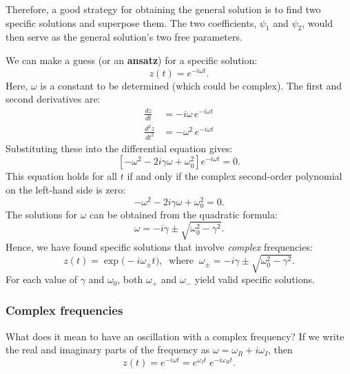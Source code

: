 \documentclass[10pt,a4paper]{article}
\begin{document}
Therefore, a good strategy for obtaining the general solution is to find
two specific solutions and superpose them. The two coefficients,
$\psi_1$ and $\psi_2$, would then serve as the general solution's
two free parameters.

We can make a guess (or an \textbf{ansatz}) for a specific solution:
\begin{equation}
z(t) = e^{-i\omega t}.
\end{equation}
Here, $\omega$ is a constant to be determined (which could be
complex). The first and second derivatives are:
\begin{align}
  \frac{dz}{dt} &= -i\omega\, e^{-i\omega t} \\
  \frac{d^2z}{dt^2} &= -\omega^2\, e^{-i\omega t}
\end{align}
Substituting these into the differential equation gives:
\begin{equation}
  \left[-\omega^2 - 2i\gamma \omega + \omega_0^2 \right] e^{-i\omega t} = 0.
\end{equation}
This equation holds for all $t$ if and only if the complex
second-order polynomial on the left-hand side is zero:
\begin{equation}
  -\omega^2 - 2i\gamma \omega + \omega_0^2 = 0.
\end{equation}
The solutions for $\omega$ can be obtained from the quadratic formula:
\begin{equation}
  \omega = -i\gamma \pm \sqrt{\omega_0^2 - \gamma^2}.
\end{equation}
Hence, we have found specific solutions that involve \emph{complex}
frequencies:
\begin{equation}
  z(t) = \exp\big(-i\omega_\pm t\big), \;\;\mathrm{where}\;\;
  \omega_\pm = -i\gamma \pm \sqrt{\omega_0^2 - \gamma^2}.
\end{equation}
For each value of $\gamma$ and $\omega_0$, both $\omega_+$ and
$\omega_-$ yield valid specific solutions.

\subsubsection{Complex frequencies}
\label{complex-frequencies}

What does it mean to have an oscillation with a complex frequency? If
we write the real and imaginary parts of the frequency as $\omega =
\omega_R + i \omega_I$, then
\begin{equation}
z(t) = e^{-i\omega t} = e^{\omega_I t} \; e^{-i\omega_R t}.
\end{equation}
\end{document}
